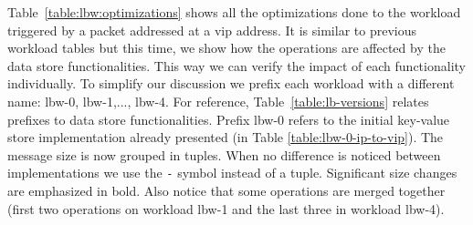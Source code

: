 \documentclass[12pt,openright,twoside]{report}
\begin{document}
\begin{figure}[ht]
\begin{floatrow}
\end{floatrow}
\end{figure}

Table~\ref{table:lbw:optimizations} shows all the optimizations done to the 
workload triggered by a packet addressed at a \gls{vip}
address.
It is similar to previous workload tables but this time, we show how the operations are affected by the data store functionalities. 
This way we can verify the impact of each functionality individually. To simplify our discussion we prefix each workload with a different name: lbw-0, lbw-1,..., lbw-4. 
For reference, Table~\ref{table:lb-versions} relates prefixes to data store functionalities. 
Prefix lbw-0 refers to the initial key-value store implementation already presented (in Table \ref{table:lbw-0-ip-to-vip}). 
The message size is now grouped in tuples.
When no difference is noticed between implementations we use the \texttt{-} symbol instead of a tuple. 
Significant size changes are emphasized  in bold. 
Also notice that some operations are merged together (first two operations on workload lbw-1 and the last three in workload lbw-4).
\end{document}
